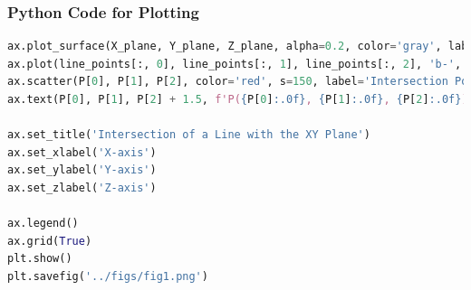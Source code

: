 \documentclass{beamer}
\theoremstyle{remark}
\numberwithin{equation}{section}
\begin{document}
\begin{frame}[fragile]
\frametitle{Python Code for Plotting}
\begin{lstlisting}[language=Python] 
ax.plot_surface(X_plane, Y_plane, Z_plane, alpha=0.2, color='gray', label='XY Plane')
ax.plot(line_points[:, 0], line_points[:, 1], line_points[:, 2], 'b-', label='The Line')
ax.scatter(P[0], P[1], P[2], color='red', s=150, label='Intersection Point')
ax.text(P[0], P[1], P[2] + 1.5, f'P({P[0]:.0f}, {P[1]:.0f}, {P[2]:.0f})', ha='center')

ax.set_title('Intersection of a Line with the XY Plane')
ax.set_xlabel('X-axis')
ax.set_ylabel('Y-axis')
ax.set_zlabel('Z-axis')

ax.legend()
ax.grid(True)
plt.show()
plt.savefig('../figs/fig1.png')
\end{lstlisting}
\end{frame}
\end{document}
